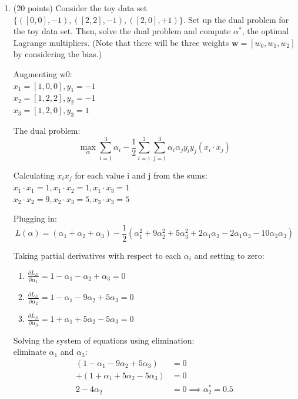\documentclass[11pt]{article}
\begin{document}
\begin{enumerate}

\item (20 points) Consider the toy data set $\{([0, 0], -1),
([2, 2], -1), ([2, 0], +1)\}$. Set up the dual problem for
the toy data set. Then, solve the dual problem and compute
$\alpha^*$, the optimal Lagrange multipliers. (Note that there will
be three weights $\boldsymbol w = [w_0, w_1, w_2]$ by considering
the bias.)

{\color{red}

Augmenting w0: \\
$x_1 = [1, 0, 0], y_1 = -1$ \\
$x_2 = [1, 2, 2], y_2 = -1$ \\
$x_3 = [1, 2, 0], y_3 = 1$

The dual problem:
\[ \max_{\alpha} \sum_{i=1}^3 \alpha_i - \frac{1}{2} \sum_{i=1}^3 \sum_{j=1}^3 \alpha_i \alpha_j y_i y_j (x_i \cdot x_j) \]

Calculating $x_ix_j $ for each value i and j from the sums:\\
$x_1 \cdot x_1 = 1, x_1 \cdot x_2 = 1, x_1 \cdot x_3 = 1$ \\
$x_2 \cdot x_2 = 9, x_2 \cdot x_3 = 5, x_3 \cdot x_3 = 5$

Plugging in:
\[ L(\alpha) = (\alpha_1 + \alpha_2 + \alpha_3) - \frac{1}{2}(\alpha_1^2 + 9\alpha_2^2 + 5\alpha_3^2 + 2\alpha_1\alpha_2 - 2\alpha_1\alpha_3 - 10\alpha_2\alpha_3) \]

Taking partial derivatives with respect to each $\alpha_i$ and setting to zero:
\begin{enumerate}
    \item $\frac{\partial L_D}{\partial \alpha_1} = 1 - \alpha_1 - \alpha_2 + \alpha_3 = 0$
    \item $\frac{\partial L_D}{\partial \alpha_2} = 1 - \alpha_1 - 9\alpha_2 + 5\alpha_3 = 0$
    \item $\frac{\partial L_D}{\partial \alpha_3} = 1 + \alpha_1 + 5\alpha_2 - 5\alpha_3 = 0$
\end{enumerate}

Solving the system of equations using elimination:\\
eliminate $\alpha_1$ and $\alpha_3$:
    \begin{align*}
    (1 - \alpha_1 - 9\alpha_2 + 5\alpha_3) & = 0 \\
    + (1 + \alpha_1 + 5\alpha_2 - 5\alpha_3) & = 0 \\
     \hline
    2 - 4\alpha_2 & = 0 \implies \alpha_2^* = 0.5
    \end{align*}

}
\end{enumerate}
\end{document}

